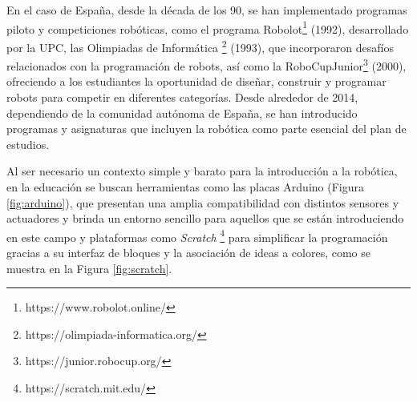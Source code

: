 En el caso de España, desde la década de los 90, se han implementado programas
piloto y competiciones robóticas, como el programa
Robolot\footnote{https://www.robolot.online/} (1992), desarrollado por la UPC,
las Olimpiadas de Informática \footnote{https://olimpiada-informatica.org/}
(1993), que incorporaron desafíos relacionados con la programación de robots,
así como la RoboCupJunior\footnote{https://junior.robocup.org/} (2000),
ofreciendo a los estudiantes la oportunidad de diseñar, construir y programar
robots para competir en diferentes categorías.
Desde alrededor de 2014, dependiendo de la comunidad autónoma de España, se han
introducido programas y asignaturas que incluyen la robótica como parte esencial
del plan de estudios.

Al ser necesario un contexto simple y barato para la introducción a la robótica,
en la educación se buscan herramientas como las placas Arduino (Figura
\ref{fig:arduino}), que presentan una amplia compatibilidad con distintos
sensores y actuadores y brinda un entorno sencillo para aquellos que se están
introduciendo en este campo y plataformas como \textit{Scratch}
\footnote{https://scratch.mit.edu/} para simplificar
la programación gracias a su interfaz de bloques y la asociación de ideas a
colores, como se muestra en la Figura \ref{fig:scratch}.

